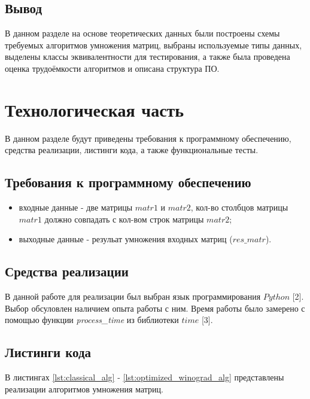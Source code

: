 \documentclass[a4paper,14pt, unknownkeysallowed]{extreport}
\begin{document}
\section{Вывод}

В данном разделе на основе теоретических данных были построены схемы требуемых алгоритмов умножения матриц, выбраны используемые типы данных, выделены классы эквивалентности для тестирования, а также была проведена оценка трудоёмкости алгоритмов и описана структура ПО.

\clearpage





\chapter{Технологическая часть}

В данном разделе будут приведены требования к программному обеспечению, средства реализации, листинги кода, а также функциональные тесты.

\section{Требования к программному обеспечению}

\begin{itemize}
    \item входные данные - две матрицы $matr1$ и $matr2$, кол-во столбцов матрицы $matr1$ должно совпадать с кол-вом строк матрицы $matr2$;
    \item выходные данные - резульат умножения входных матриц ($res\_matr$).
\end{itemize}

\section{Средства реализации}
В данной работе для реализации был выбран язык программирования $Python$ [2]. Выбор обсуловлен наличием опыта работы с ним. Время работы было замерено с помощью функции \textit{process\_time} из библиотеки $time$ [3].

\clearpage

\section{Листинги кода}

В листингах \ref{lst:classical_alg} - \ref{lst:optimized_winograd_alg} представлены реализации алгоритмов умножения матриц.
\end{document}
